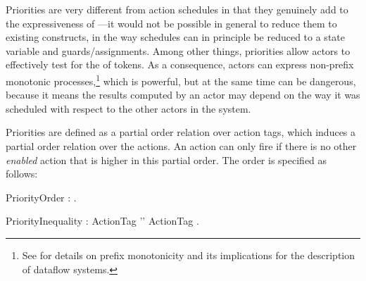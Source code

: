 

Priorities are very different
from action schedules in that they genuinely add to the expressiveness
of \Cal---it would not be possible in general to reduce them to
existing constructs, in the way schedules can in principle be reduced
to a state variable and guards/assignments. Among other things,
priorities allow actors to effectively test for the  of tokens. As a
consequence, actors can express non-prefix monotonic
processes,\footnote{See \cite{LeeEA97} for details on prefix
  monotonicity and its implications for the description of dataflow
  systems.} which is powerful, but at the same time can be dangerous,
because it means the results computed by an actor may depend on the
way it was scheduled with respect to the other actors in the system.


Priorities are defined as a partial order relation over action tags,
which induces a partial
order relation over the actions. An action can only fire if there is
no other {\em enabled} action that is higher in this partial order.
The order is specified as follows:


\bgr
  PriorityOrder : \kwPriority {} \kwEnd.

  PriorityInequality : ActionTag '\charMore' ActionTag .
\egr


